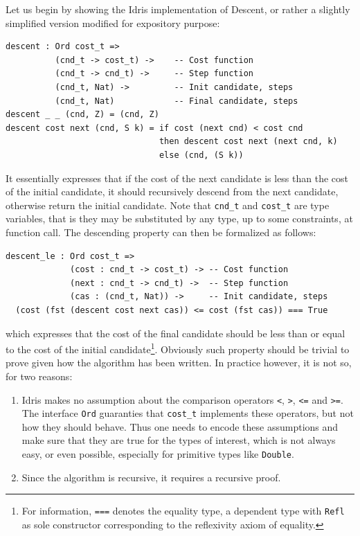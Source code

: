 \documentclass[]{report}
\begin{document}
Let us begin by showing the Idris implementation of Descent, or rather
a slightly simplified version modified for expository purpose:
\begin{verbatim}
descent : Ord cost_t =>
          (cnd_t -> cost_t) ->    -- Cost function
          (cnd_t -> cnd_t) ->     -- Step function
          (cnd_t, Nat) ->         -- Init candidate, steps
          (cnd_t, Nat)            -- Final candidate, steps
descent _ _ (cnd, Z) = (cnd, Z)
descent cost next (cnd, S k) = if cost (next cnd) < cost cnd
                               then descent cost next (next cnd, k)
                               else (cnd, (S k))
\end{verbatim}
It essentially expresses that if the cost of the next candidate is
less than the cost of the initial candidate, it should recursively
descend from the next candidate, otherwise return the initial
candidate.  Note that \texttt{cnd\_t} and \texttt{cost\_t} are type
variables, that is they may be substituted by any type, up to some
constraints, at function call.  The descending property can then be
formalized as follows:
\begin{verbatim}
descent_le : Ord cost_t =>
             (cost : cnd_t -> cost_t) -> -- Cost function
             (next : cnd_t -> cnd_t) ->  -- Step function
             (cas : (cnd_t, Nat)) ->     -- Init candidate, steps
  (cost (fst (descent cost next cas)) <= cost (fst cas)) === True
\end{verbatim}
which expresses that the cost of the final candidate should be less
than or equal to the cost of the initial candidate\footnote{For
  information, \texttt{===} denotes the equality type, a dependent
  type with \texttt{Refl} as sole constructor corresponding to the
  reflexivity axiom of equality.}.  Obviously such property should be
trivial to prove given how the algorithm has been written.  In
practice however, it is not so, for two reasons:
\begin{enumerate}
\item Idris makes no assumption about the comparison operators
  \texttt{<}, \texttt{>}, \texttt{<=} and \texttt{>=}.  The interface
  \texttt{Ord} guaranties that \texttt{cost\_t} implements these
  operators, but not how they should behave.  Thus one needs to encode
  these assumptions and make sure that they are true for the types of
  interest, which is not always easy, or even possible, especially for
  primitive types like \texttt{Double}.
\item Since the algorithm is recursive, it requires a recursive proof.
\end{enumerate}
\end{document}
